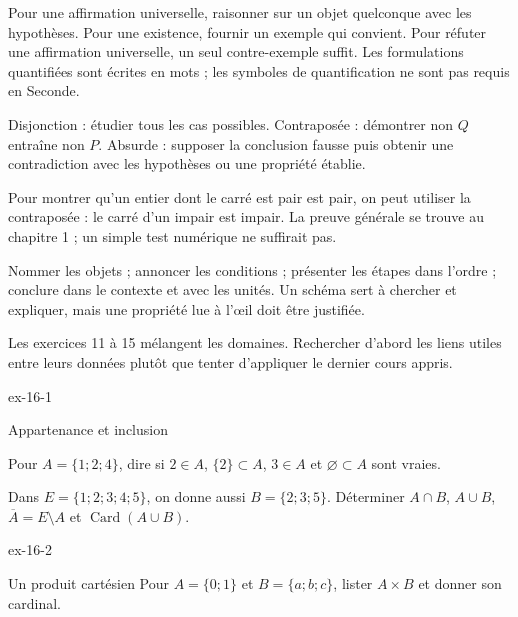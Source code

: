 \clearpage
{}
\begin{savoirfaire}
Pour une affirmation universelle, raisonner sur un objet quelconque avec les hypothèses. Pour une existence, fournir un exemple qui convient. Pour réfuter une affirmation universelle, un seul contre-exemple suffit. Les formulations quantifiées sont écrites en mots ; les symboles de quantification ne sont pas requis en Seconde.
\end{savoirfaire}
\begin{savoirfaire}
Disjonction : étudier tous les cas possibles. Contraposée : démontrer non $Q$ entraîne non $P$. Absurde : supposer la conclusion fausse puis obtenir une contradiction avec les hypothèses ou une propriété établie.
\end{savoirfaire}
\begin{exemple}Pour montrer qu’un entier dont le carré est pair est pair, on peut utiliser la contraposée : le carré d’un impair est impair. La preuve générale se trouve au chapitre 1 ; un simple test numérique ne suffirait pas.\end{exemple}
Nommer les objets ; annoncer les conditions ; présenter les étapes dans l’ordre ; conclure dans le contexte et avec les unités. Un schéma sert à chercher et expliquer, mais une propriété lue à l’œil doit être justifiée.
\par\medskip Les exercices 11 à 15 mélangent les domaines. Rechercher d’abord les liens utiles entre leurs données plutôt que tenter d’appliquer le dernier cours appris.
\clearpage{}
\begin{blocLivre}{ex-16-1}
\begin{exercice}[1]{Appartenance et inclusion}
\begin{questions}
\item Pour $A=\{1;2;4\}$, dire si $2\in A$, $\{2\}\subset A$, $3\in A$ et $\varnothing\subset A$ sont vraies.
\item Dans $E=\{1;2;3;4;5\}$, on donne aussi $B=\{2;3;5\}$. Déterminer $A\cap B$, $A\cup B$, $\overline A=E\setminus A$ et $\operatorname{Card}(A\cup B)$.
\end{questions}
\end{exercice}
\end{blocLivre}
\begin{blocLivre}{ex-16-2}
\begin{exercice}[1]{Un produit cartésien}
Pour $A=\{0;1\}$ et $B=\{a;b;c\}$, lister $A\times B$ et donner son cardinal.
\end{exercice}
\end{blocLivre}
